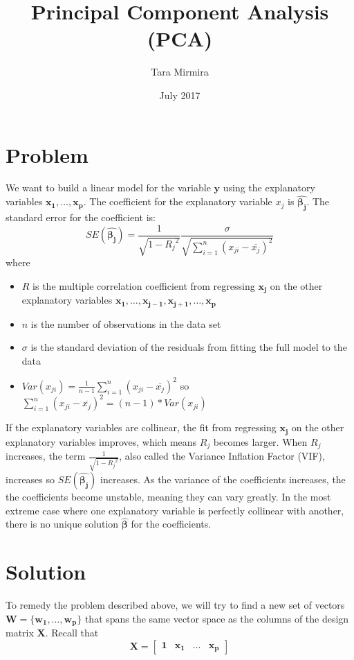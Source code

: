\documentclass{article}
\title{Principal Component Analysis (PCA)}
\author{Tara Mirmira }
\date{July 2017}
\begin{document}
\maketitle

\section{Problem}
We want to build a linear model for the variable $\boldsymbol{y}$ using the explanatory variables $\boldsymbol{x_1}, \ldots, \boldsymbol{x_p}$. The coefficient for the explanatory variable $x_j$ is $\hat{\boldsymbol{\beta_j}}$. The standard error for the coefficient is:
$$
SE(\hat{\boldsymbol{\beta_j}}) = \dfrac{1}{\sqrt{1 - {R_j}^2}}\dfrac{\sigma}{\sqrt{\sum_{i=1}^n (x_{ji} - \overline{x_j})^2}}
$$
where
\begin{itemize}
    \item $R$ is the multiple correlation coefficient from regressing $\boldsymbol{x_j}$ on the other explanatory variables $\boldsymbol{x_1}, \ldots, \boldsymbol{x_{j-1}}, \boldsymbol{x_{j+1}}, \ldots, \boldsymbol{x_p}$
    \item $n$ is the number of observations in the data set
    \item $\sigma$ is the standard deviation of the residuals from fitting the full model to the data
    \item $Var(x_{ji}) = \frac{1}{n-1}\sum_{i=1}^n (x_{ji} - \overline{x_j})^2$ so $\sum_{i=1}^n (x_{ji} - \overline{x_j})^2 = (n-1)*Var(x_{ji})$
\end{itemize}

If the explanatory variables are collinear, the fit from regressing $\boldsymbol{x_j}$ on the other explanatory variables improves, which means $R_j$ becomes larger. When $R_j$ increases, the term $\frac{1}{\sqrt{1-{R_j}^2}}$, also called the Variance Inflation Factor (VIF), increases so $SE(\hat{\boldsymbol{\beta_j}})$ increases. As the variance of the coefficients increases, the the coefficients become unstable, meaning they can vary greatly. In the most extreme case where one explanatory variable is perfectly collinear with another, there is no unique solution $\boldsymbol{\hat{\beta}}$ for the coefficients.

\section{Solution}

To remedy the problem described above, we will try to find a new set of vectors $\boldsymbol{W} = \{\boldsymbol{w_1}, \ldots, \boldsymbol{w_p}\}$ that spans the same vector space as the columns of the design matrix $\boldsymbol{X}$. Recall that  
$$
\boldsymbol{X} = \begin{bmatrix}
    \boldsymbol{1}       & \boldsymbol{x_1} & \dots & \boldsymbol{x_p}
\end{bmatrix}
$$
\end{document}
